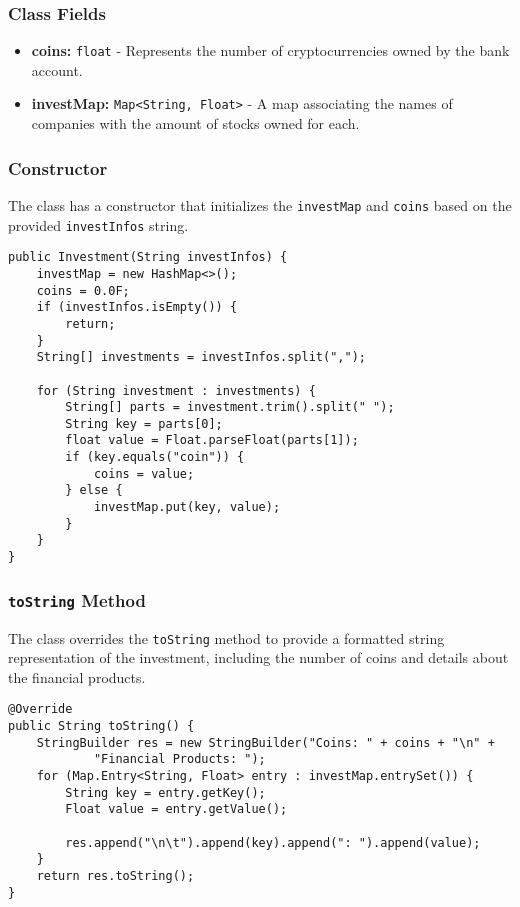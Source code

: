 \documentclass{article}
\begin{document}
\subsubsection{Class Fields}

\begin{itemize}
    \item \textbf{coins:} \texttt{float} - Represents the number of cryptocurrencies owned by the bank account.
    
    \item \textbf{investMap:} \texttt{Map<String, Float>} - A map associating the names of companies with the amount of stocks owned for each.
\end{itemize}

\subsubsection{Constructor}

The class has a constructor that initializes the \texttt{investMap} and \texttt{coins} based on the provided \texttt{investInfos} string.

\begin{verbatim}
public Investment(String investInfos) {
    investMap = new HashMap<>();
    coins = 0.0F;
    if (investInfos.isEmpty()) {
        return;
    }
    String[] investments = investInfos.split(",");

    for (String investment : investments) {
        String[] parts = investment.trim().split(" ");
        String key = parts[0];
        float value = Float.parseFloat(parts[1]);
        if (key.equals("coin")) {
            coins = value;
        } else {
            investMap.put(key, value);
        }
    }
}
\end{verbatim}

\subsubsection{\texttt{toString} Method}

The class overrides the \texttt{toString} method to provide a formatted string representation of the investment, including the number of coins and details about the financial products.

\begin{verbatim}
@Override
public String toString() {
    StringBuilder res = new StringBuilder("Coins: " + coins + "\n" +
            "Financial Products: ");
    for (Map.Entry<String, Float> entry : investMap.entrySet()) {
        String key = entry.getKey();
        Float value = entry.getValue();

        res.append("\n\t").append(key).append(": ").append(value);
    }
    return res.toString();
}
\end{verbatim}
\end{document}
